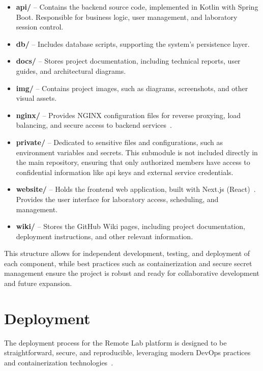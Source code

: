 \begin{itemize}
    \item \textbf{api/} – Contains the backend source code, implemented in Kotlin with Spring Boot. Responsible for business logic, user management, and laboratory session control.
    \item \textbf{db/} – Includes database scripts, supporting the system's persistence layer.
    \item \textbf{docs/} – Stores project documentation, including technical reports, user guides, and architectural diagrams.
    \item \textbf{img/} – Contains project images, such as diagrams, screenshots, and other visual assets.
    \item \textbf{nginx/} – Provides NGINX configuration files for reverse proxying, load balancing, and secure access to backend services~\cite{nginx-docs}.
    \item \textbf{private/} – Dedicated to sensitive files and configurations, such as environment variables and secrets. This submodule is not included directly in the main repository, ensuring that only authorized members have access to confidential information like \ac{api} keys and external service credentials.
    \item \textbf{website/} – Holds the frontend web application, built with Next.js (React)~\cite{nextjs-docs}. Provides the user interface for laboratory access, scheduling, and management.
    \item \textbf{wiki/} – Stores the GitHub Wiki pages, including project documentation, deployment instructions, and other relevant information.
\end{itemize}

This structure allows for independent development, testing, and deployment of each component, while best practices such as containerization and secure secret management ensure the project is robust and ready for collaborative development and future expansion.

\section{Deployment} \label{sec:deployment}

The deployment process for the Remote Lab platform is designed to be straightforward, secure, and reproducible, leveraging modern DevOps practices and containerization technologies~\cite{docker-docs,docker-compose-docs}.

